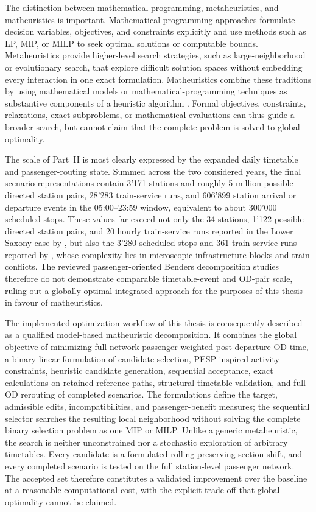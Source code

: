 \documentclass[preprint,12pt]{elsarticle}
\begin{document}
The distinction between mathematical programming, metaheuristics, and matheuristics is important. Mathematical-programming approaches formulate decision variables, objectives, and constraints explicitly and use methods such as LP, MIP, or MILP to seek optimal solutions or computable bounds. Metaheuristics provide higher-level search strategies, such as large-neighborhood or evolutionary search, that explore difficult solution spaces without embedding every interaction in one exact formulation. Matheuristics combine these traditions by using mathematical models or mathematical-programming techniques as substantive components of a heuristic algorithm \citep{boschettiManiezzo2022Matheuristics}. Formal objectives, constraints, relaxations, exact subproblems, or mathematical evaluations can thus guide a broader search, but cannot claim that the complete problem is solved to global optimality.

The scale of Part~II is most clearly expressed by the expanded daily timetable and passenger-routing state. Summed across the two considered years, the final scenario representations contain 3'171 stations and roughly 5 million possible directed station pairs, 28'283 train-service runs, and 606'899 station arrival or departure events in the 05:00--23:59 window, equivalent to about 300'000 scheduled stops. These values far exceed not only the 34 stations, 1'122 possible directed station pairs, and 20 hourly train-service runs reported in the Lower Saxony case by \citet{yaoEtAl2025HybridBenders}, but also the 3'280 scheduled stops and 361 train-service runs reported by \citet{leutwilerCorman2022LogicBenders}, whose complexity lies in microscopic infrastructure blocks and train conflicts. The reviewed passenger-oriented Benders decomposition studies therefore do not demonstrate comparable timetable-event and OD-pair scale, ruling out a globally optimal integrated approach for the purposes of this thesis in favour of matheuristics.

The implemented optimization workflow of this thesis is consequently described as a qualified model-based matheuristic decomposition. It combines the global objective of minimizing full-network passenger-weighted post-departure OD time, a binary linear formulation of candidate selection, PESP-inspired activity constraints, heuristic candidate generation, sequential acceptance, exact calculations on retained reference paths, structural timetable validation, and full OD rerouting of completed scenarios. The formulations define the target, admissible edits, incompatibilities, and passenger-benefit measures; the sequential selector searches the resulting local neighborhood without solving the complete binary selection problem as one MIP or MILP. Unlike a generic metaheuristic, the search is neither unconstrained nor a stochastic exploration of arbitrary timetables. Every candidate is a formulated rolling-preserving section shift, and every completed scenario is tested on the full station-level passenger network. The accepted set therefore constitutes a validated improvement over the baseline at a reasonable computational cost, with the explicit trade-off that global optimality cannot be claimed.
\end{document}
